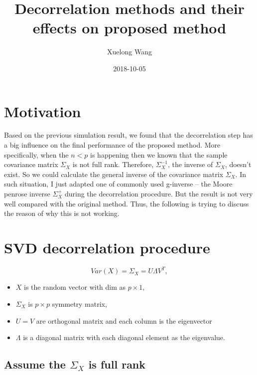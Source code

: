 \documentclass[]{article}
\title{Decorrelation methods and their effects on proposed method}
\author{Xuelong Wang}
\date{2018-10-05}
\providecommand{\tightlist}{%
  \setlength{\itemsep}{0pt}\setlength{\parskip}{0pt}}
\begin{document}
\maketitle

{
\setcounter{tocdepth}{2}
\tableofcontents
}
\section{Motivation}\label{motivation}

Based on the previous simulation result, we found that the decorrelation
step has a big influence on the final performance of the proposed
method. More specifically, when the \(n<p\) is happening then we known
that the sample covariance matrix \(\Sigma_{X}\) is not full rank.
Therefore, \(\Sigma^{-1}_X\), the inverse of \(\Sigma_{X}\), doesn't
exist. So we could calculate the general inverse of the covariance
matrix \(\Sigma_{X}\). In such situation, I just adapted one of commonly
used g-inverse -- the Moore penrose inverse \(\Sigma^{+}_X\) during the
decorrelation procedure. But the result is not very well compared with
the original method. Thus, the following is trying to discuss the reason
of why this is not working.

\section{SVD decorrelation procedure}\label{svd-decorrelation-procedure}

\[
  Var(X) = \Sigma_X = U\Lambda V^T,
\]

\begin{itemize}
\tightlist
\item
  \(X\) is the random vector with dim as \(p \times 1\),\\
\item
  \(\Sigma_X\) is \(p \times p\) symmetry matrix,\\
\item
  \(U = V\) are orthogonal matrix and each column is the eigenvector\\
\item
  \(\Lambda\) is a diagonal matrix with each diagonal element as the
  eigenvalue.
\end{itemize}

\subsection{\texorpdfstring{Assume the \(\Sigma_X\) is full
rank}{Assume the \textbackslash{}Sigma\_X is full rank}}\label{assume-the-sigma_x-is-full-rank}
\end{document}
